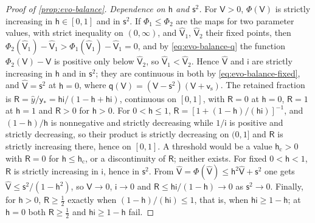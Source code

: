 \begin{proof}[Proof of \cref{prop:evo-balance}]
\emph{Dependence on $\mathsf h$ and $\mathsf s^2$.} For $\mathsf V>0$, $\Phi(\mathsf V)$ is strictly increasing in $\mathsf h\in[0,1]$ and in $\mathsf s^2$. If $\Phi_1\le\Phi_2$ are the maps for two parameter values, with strict inequality on $(0,\infty)$, and $\hat{\mathsf V}_1$, $\hat{\mathsf V}_2$ their fixed points, then $\Phi_2(\hat{\mathsf V}_1)-\hat{\mathsf V}_1>\Phi_1(\hat{\mathsf V}_1)-\hat{\mathsf V}_1=0$, and by \eqref{eq:evo-balance-q} the function $\Phi_2(\mathsf V)-\mathsf V$ is positive only below $\hat{\mathsf V}_2$, so $\hat{\mathsf V}_1<\hat{\mathsf V}_2$. Hence $\hat{\mathsf V}$ and $\mathsf i$ are strictly increasing in $\mathsf h$ and in $\mathsf s^2$; they are continuous in both by \eqref{eq:evo-balance-fixed}, and $\hat{\mathsf V}=\mathsf s^2$ at $\mathsf h=0$, where $\mathsf q(\mathsf V)=(\mathsf V-\mathsf s^2)(\mathsf V+\mathsf v_{\mathrm s})$. The retained fraction is $\mathsf R=\hat y/\mathsf y_\ast=\mathsf h\mathsf i/(1-\mathsf h+\mathsf h\mathsf i)$, continuous on $[0,1]$, with $\mathsf R=0$ at $\mathsf h=0$, $\mathsf R=1$ at $\mathsf h=1$ and $\mathsf R>0$ for $\mathsf h>0$. For $0<\mathsf h\le1$, $\mathsf R=[1+(1-\mathsf h)/(\mathsf h\mathsf i)]^{-1}$, and $(1-\mathsf h)/\mathsf h$ is nonnegative and strictly decreasing while $1/\mathsf i$ is positive and strictly decreasing, so their product is strictly decreasing on $(0,1]$ and $\mathsf R$ is strictly increasing there, hence on $[0,1]$. A threshold would be a value $\mathsf h_{\mathrm c}>0$ with $\mathsf R=0$ for $\mathsf h\le\mathsf h_{\mathrm c}$, or a discontinuity of $\mathsf R$; neither exists. For fixed $0<\mathsf h<1$, $\mathsf R$ is strictly increasing in $\mathsf i$, hence in $\mathsf s^2$. From $\hat{\mathsf V}=\Phi(\hat{\mathsf V})\le\mathsf h^2\hat{\mathsf V}+\mathsf s^2$ one gets $\hat{\mathsf V}\le\mathsf s^2/(1-\mathsf h^2)$, so $\hat{\mathsf V}\to0$, $\mathsf i\to0$ and $\mathsf R\le\mathsf h\mathsf i/(1-\mathsf h)\to0$ as $\mathsf s^2\to0$. Finally, for $\mathsf h>0$, $\mathsf R\ge\frac12$ exactly when $(1-\mathsf h)/(\mathsf h\mathsf i)\le1$, that is, when $\mathsf h\mathsf i\ge1-\mathsf h$; at $\mathsf h=0$ both $\mathsf R\ge\frac12$ and $\mathsf h\mathsf i\ge1-\mathsf h$ fail.
\end{proof}


